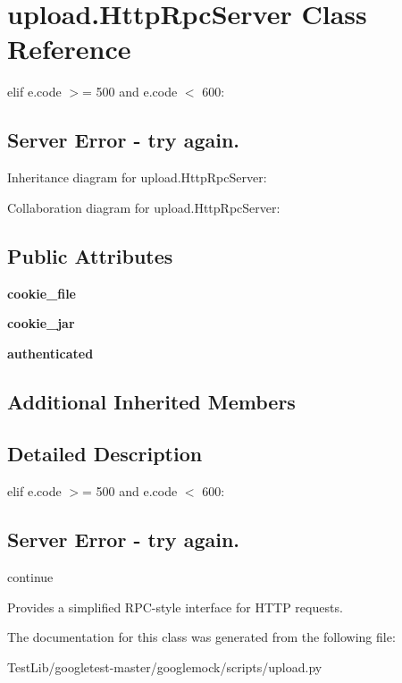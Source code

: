 \hypertarget{classupload_1_1HttpRpcServer}{}\section{upload.\+Http\+Rpc\+Server Class Reference}
\label{classupload_1_1HttpRpcServer}


elif e.\+code $>$= 500 and e.\+code $<$ 600\+: \subsection*{Server Error -\/ try again.} 




Inheritance diagram for upload.\+Http\+Rpc\+Server\+:


Collaboration diagram for upload.\+Http\+Rpc\+Server\+:
\subsection*{Public Attributes}
\begin{DoxyCompactItemize}
\item 
\mbox{\label{classupload_1_1HttpRpcServer_ad5c1a730c030f9d3b5f70c2e0d8b9a1d}} 
{\bfseries cookie\+\_\+file}
\item 
\mbox{\label{classupload_1_1HttpRpcServer_a1b9c9af7f0a46afd84a9d524782323bf}} 
{\bfseries cookie\+\_\+jar}
\item 
\mbox{\label{classupload_1_1HttpRpcServer_aaa356e2491537dd0d4bfc5b1bb0fec96}} 
{\bfseries authenticated}
\end{DoxyCompactItemize}
\subsection*{Additional Inherited Members}


\subsection{Detailed Description}
elif e.\+code $>$= 500 and e.\+code $<$ 600\+: \subsection*{Server Error -\/ try again.}

continue \begin{DoxyVerb}Provides a simplified RPC-style interface for HTTP requests.\end{DoxyVerb}
 

The documentation for this class was generated from the following file\+:\begin{DoxyCompactItemize}
\item 
Test\+Lib/googletest-\/master/googlemock/scripts/upload.\+py\end{DoxyCompactItemize}
